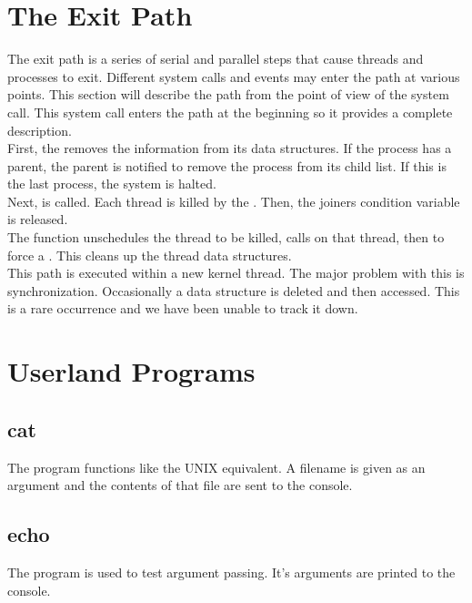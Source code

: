   \section{The Exit Path}
  \label{xref:exitpath}
    The exit path is a series of serial and parallel steps that cause threads and
    processes to exit. Different system calls and events may enter the path at various
    points. This section will describe the path from the point of view of the
     system call. This system call enters the path at the beginning so it
    provides a complete description.\\

    First, the  removes the  information from its data
    structures. If the process has a parent, the parent is notified to remove the process
    from its child list. If this is the last process, the system is halted.\\

    Next,  is called. Each thread is killed by the
    . Then, the joiners condition variable is 
    released.\\

    The  function unschedules the thread to be killed,
    calls  on that thread, then  to force a
    . This cleans up the thread data structures.\\

    This path is executed within a new kernel thread. The major problem with this is
    synchronization. Occasionally a data structure is deleted and then accessed. This is
    a rare occurrence and we have been unable to track it down.

  \section{Userland Programs}
    \subsection{cat}
      The  program functions like the UNIX equivalent. A filename is given as
      an argument and the contents of that file are sent to the console.
    
    \subsection{echo}
      The  program is used to test argument passing. It's arguments are
      printed to the console.
    
